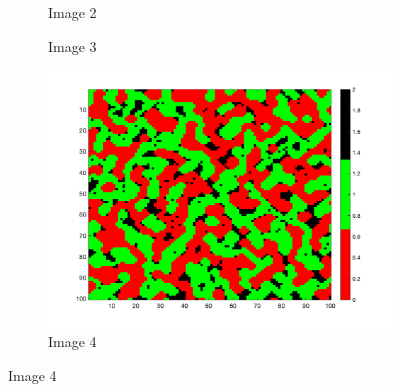 \documentclass[unicode,11pt,a4paper,oneside,numbers=endperiod,openany]{scrartcl}
\begin{document}
\begin{figure}[H]
\begin{subfigure}[b]{0.3\textwidth}
        \caption{Image 2}
        \label{fig:image2}
      \end{subfigure}
      \begin{subfigure}[b]{0.3\textwidth}
        \caption{Image 3}
        \label{fig:image3}
      \end{subfigure}
      \begin{subfigure}[b]{0.3\textwidth}
        \includegraphics[width=\textwidth]{results/iterations_196_H_4_random_1.png}
        \caption{Image 4}
        \label{fig:image4}
      \end{subfigure}

\end{figure}
\end{document}
